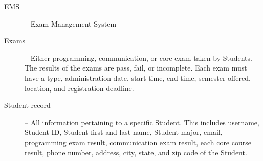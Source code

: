 
\begin{description}
   \item[EMS] -- Exam Management System 
   \item[Exams] --  Either programming, communication, or core exam taken by Students.
      The results of the exams are pass, fail, or incomplete. Each exam must
      have a type, administration date, start time, end time, semester offered,
      location, and registration deadline.
   \item[Student record] --  All information pertaining to a specific Student. This
      includes username, Student ID, Student first and last name, Student major,
      email, programming exam result, communication exam result, each core
      course result, phone number, address, city, state, and zip code of the
      Student.
\end{description}
